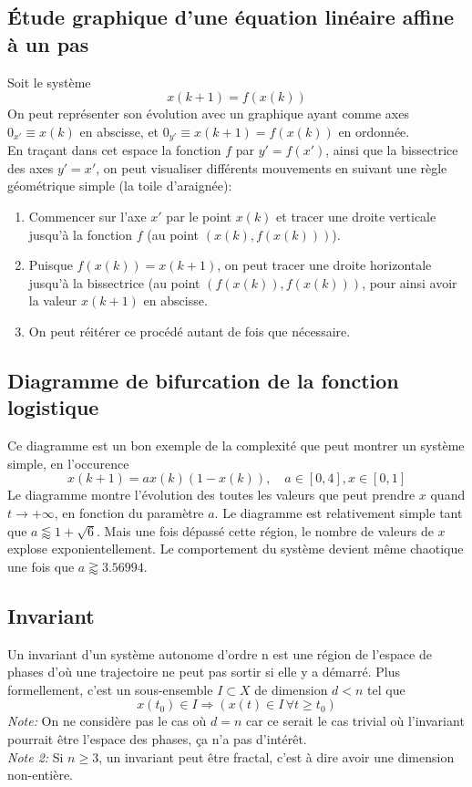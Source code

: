 \documentclass[a4paper]{article}
\begin{document}
\subsection{Étude graphique d'une équation linéaire affine à un pas}
Soit le système
\[x(k+1)=f(x(k))\]
On peut représenter son évolution avec un graphique ayant comme axes
\(0_{x'}\equiv x(k)\) en abscisse, et \(0_{y'}\equiv x(k+1)=f(x(k))\) en ordonnée.\\
En traçant dans cet espace la fonction \(f\) par \(y'=f(x')\), ainsi que la
bissectrice des axes \(y'=x'\), on peut visualiser différents mouvements
en suivant une règle géométrique simple (la toile d'araignée):
\begin{enumerate}
	\item Commencer sur l'axe \(x'\) par le point \(x(k)\) et tracer une droite
		verticale jusqu'à la fonction \(f\) (au point \((x(k),f(x(k)))\)).
	\item Puisque \(f(x(k))=x(k+1)\), on peut tracer une droite horizontale
		jusqu'à la bissectrice (au point \((f(x(k)),f(x(k)))\), pour ainsi
		avoir la valeur \(x(k+1)\) en abscisse.
	\item On peut réitérer ce procédé autant de fois que nécessaire.
\end{enumerate}

\subsection{Diagramme de bifurcation de la fonction logistique}
Ce diagramme est un bon exemple de la complexité que peut montrer un
système simple, en l'occurence
\[x(k+1)=ax(k)(1-x(k)),\quad a\in[0,4],x\in[0,1]\]
Le diagramme montre l'évolution des toutes les valeurs que peut prendre
\(x\) quand \(t\to + \infty \), en fonction du paramètre \(a\).
Le diagramme est relativement simple tant que \(a\lessapprox 1+\sqrt{6}\).
Mais une fois dépassé cette région, le nombre de valeurs de \(x\) explose
exponientellement. Le comportement du système devient même chaotique une
fois que \(a \gtrapprox 3.56994\).

\subsection{Invariant}
Un invariant d'un système autonome d'ordre n est une région de l'espace de
phases d'où une trajectoire ne peut pas sortir si elle y a démarré. Plus
formellement, c'est un sous-ensemble \(I\subset X\) de dimension \(d < n\) tel
que \[x(t_0)\in I\Rightarrow (x(t)\in I\,\forall t \ge t_0)\]
\emph{Note:} On ne considère pas le cas où \(d=n\) car ce serait le cas
trivial où l'invariant pourrait être l'espace des phases, ça n'a pas
d'intérêt.\\
\emph{Note 2:} Si \(n \ge 3\), un invariant peut être fractal, c'est à dire
avoir une dimension non-entière.
\end{document}
